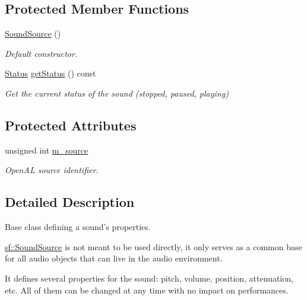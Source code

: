 \subsection*{Protected Member Functions}
\begin{DoxyCompactItemize}
\item 
\hyperlink{classsf_1_1SoundSource_aefa4bd4460f387d81a0637d293979436}{Sound\-Source} ()
\begin{DoxyCompactList}\small\item\em Default constructor. \end{DoxyCompactList}\item 
\hyperlink{classsf_1_1SoundSource_ac43af72c98c077500b239bc75b812f03}{Status} \hyperlink{classsf_1_1SoundSource_ad1995d2888773f47f99b671747609dbb}{get\-Status} () const 
\begin{DoxyCompactList}\small\item\em Get the current status of the sound (stopped, paused, playing) \end{DoxyCompactList}\end{DoxyCompactItemize}
\subsection*{Protected Attributes}
\begin{DoxyCompactItemize}
\item 
\hypertarget{classsf_1_1SoundSource_a0223cef4b1c587e6e1e17b4c92c4479c}{unsigned int \hyperlink{classsf_1_1SoundSource_a0223cef4b1c587e6e1e17b4c92c4479c}{m\-\_\-source}}\label{classsf_1_1SoundSource_a0223cef4b1c587e6e1e17b4c92c4479c}

\begin{DoxyCompactList}\small\item\em Open\-A\-L source identifier. \end{DoxyCompactList}\end{DoxyCompactItemize}


\subsection{Detailed Description}
Base class defining a sound's properties. 

\hyperlink{classsf_1_1SoundSource}{sf\-::\-Sound\-Source} is not meant to be used directly, it only serves as a common base for all audio objects that can live in the audio environment.

It defines several properties for the sound\-: pitch, volume, position, attenuation, etc. All of them can be changed at any time with no impact on performances.

